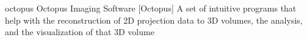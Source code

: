 \newglsXsoftware%
{octopus}%
{Octopus Imaging Software}%
[Octopus]%
{A set of intuitive programs that help with the reconstruction of 2D projection data to 3D volumes, the analysis, and the visualization of that 3D volume \cite{website:Octopus_Imaging}}%